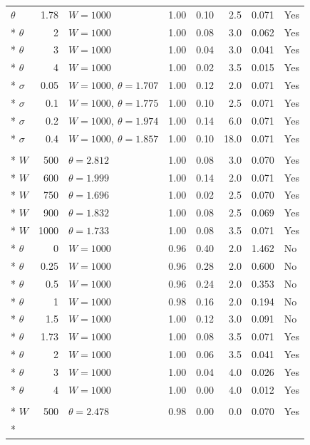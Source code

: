 \documentclass[preprint,12pt]{elsarticle}
\begin{document}
\begin{longtable}{lrlrrrrl}
$\theta$ & 1.78 & $W=1000$ & 1.00 & 0.10 & 2.5 & 0.071 & Yes\\*
$\theta$ & 2 & $W=1000$ & 1.00 & 0.08 & 3.0 & 0.062 & Yes\\*
$\theta$ & 3 & $W=1000$ & 1.00 & 0.04 & 3.0 & 0.041 & Yes\\*
$\theta$ & 4 & $W=1000$ & 1.00 & 0.02 & 3.5 & 0.015 & Yes\\*
$\sigma$ & 0.05 & $W=1000,\ \theta=1.707$ & 1.00 & 0.12 & 2.0 & 0.071 & Yes\\*
$\sigma$ & 0.1 & $W=1000,\ \theta=1.775$ & 1.00 & 0.10 & 2.5 & 0.071 & Yes\\*
$\sigma$ & 0.2 & $W=1000,\ \theta=1.974$ & 1.00 & 0.14 & 6.0 & 0.071 & Yes\\*
$\sigma$ & 0.4 & $W=1000,\ \theta=1.857$ & 1.00 & 0.10 & 18.0 & 0.071 & Yes\\
\addlinespace
\multicolumn{8}{l}{\textit{F1$\to$F2}}\\*
$W$ & 500 & $\theta=2.812$ & 1.00 & 0.08 & 3.0 & 0.070 & Yes\\*
$W$ & 600 & $\theta=1.999$ & 1.00 & 0.14 & 2.0 & 0.071 & Yes\\*
$W$ & 750 & $\theta=1.696$ & 1.00 & 0.02 & 2.5 & 0.070 & Yes\\*
$W$ & 900 & $\theta=1.832$ & 1.00 & 0.08 & 2.5 & 0.069 & Yes\\*
$W$ & 1000 & $\theta=1.733$ & 1.00 & 0.08 & 3.5 & 0.071 & Yes\\*
$\theta$ & 0 & $W=1000$ & 0.96 & 0.40 & 2.0 & 1.462 & No\\*
$\theta$ & 0.25 & $W=1000$ & 0.96 & 0.28 & 2.0 & 0.600 & No\\*
$\theta$ & 0.5 & $W=1000$ & 0.96 & 0.24 & 2.0 & 0.353 & No\\*
$\theta$ & 1 & $W=1000$ & 0.98 & 0.16 & 2.0 & 0.194 & No\\*
$\theta$ & 1.5 & $W=1000$ & 1.00 & 0.12 & 3.0 & 0.091 & No\\*
$\theta$ & 1.73 & $W=1000$ & 1.00 & 0.08 & 3.5 & 0.071 & Yes\\*
$\theta$ & 2 & $W=1000$ & 1.00 & 0.06 & 3.5 & 0.041 & Yes\\*
$\theta$ & 3 & $W=1000$ & 1.00 & 0.04 & 4.0 & 0.026 & Yes\\*
$\theta$ & 4 & $W=1000$ & 1.00 & 0.00 & 4.0 & 0.012 & Yes\\
\addlinespace
\multicolumn{8}{l}{\textit{F2$\to$F1}}\\*
$W$ & 500 & $\theta=2.478$ & 0.98 & 0.00 & 0.0 & 0.070 & Yes\\*

\end{longtable}
\end{document}
